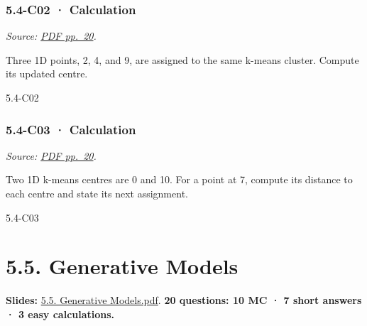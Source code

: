 \noindent\begin{minipage}{\linewidth}

\subsubsection{5.4-C02 · Calculation}\label{c02-calculation-15}

\emph{Source:
\href{../Lecture\%20Slides/5.4.\%20Unsupervised\%20learning.pdf\#page=20}{PDF
pp.~20}.}

Three 1D points, 2, 4, and 9, are assigned to the same k-means cluster.
Compute its updated centre.

\begin{solution}[26mm]{5.4-C02}

\end{solution}
\end{minipage}\par\medskip

\noindent\begin{minipage}{\linewidth}

\subsubsection{5.4-C03 · Calculation}\label{c03-calculation-15}

\emph{Source:
\href{../Lecture\%20Slides/5.4.\%20Unsupervised\%20learning.pdf\#page=20}{PDF
pp.~20}.}

Two 1D k-means centres are 0 and 10. For a point at 7, compute its
distance to each centre and state its next assignment.

\begin{solution}[26mm]{5.4-C03}

\end{solution}
\end{minipage}\par\medskip

\clearpage

\section{5.5. Generative Models}\label{generative-models}

\textbf{Slides:}
\href{../Lecture\%20Slides/5.5.\%20Generative\%20Models.pdf}{5.5.
Generative Models.pdf}. \textbf{20 questions: 10 MC · 7 short answers ·
3 easy calculations.}

